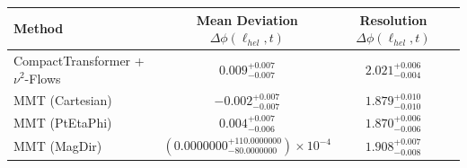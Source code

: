     \begin{tabular}{lccc}
        \toprule
        Method & Mean Deviation $\Delta\phi(\ell_{hel}, t)$ & Resolution $\Delta\phi(\ell_{hel}, t)$ \\
        \midrule
        CompactTransformer + $\nu^2$-Flows & $0.009^{+0.007}_{-0.007}$ & $2.021^{+0.006}_{-0.004}$ \\
        MMT (Cartesian) & $-0.002^{+0.007}_{-0.007}$ & $1.879^{+0.010}_{-0.010}$ \\
        MMT (PtEtaPhi) & $0.004^{+0.007}_{-0.006}$ & $1.870^{+0.006}_{-0.006}$ \\
        MMT (MagDir) & $(0.0000000^{+110.0000000}_{-80.0000000})\times 10^{-4}$ & $1.908^{+0.007}_{-0.008}$ \\
        \bottomrule
    \end{tabular}
